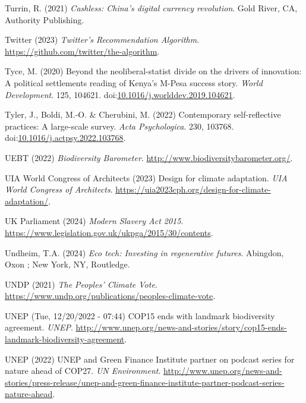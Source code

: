 \documentclass[
  letterpaper,
  DIV=11,
  numbers=noendperiod]{scrartcl}
\newlength{\cslhangindent}
\newenvironment{CSLReferences}[2] %
 {\begin{list}{}{%
  \setlength{\itemindent}{0pt}
  \setlength{\leftmargin}{0pt}
  \setlength{\parsep}{0pt}
  \ifodd #1
   \setlength{\leftmargin}{\cslhangindent}
   \setlength{\itemindent}{-1\cslhangindent}
  \fi
  \setlength{\itemsep}{#2\baselineskip}}}
 {\end{list}}
\begin{document}
\begin{CSLReferences}{0}{1}
Turrin, R. (2021) \emph{Cashless: {China}'s digital currency
revolution}. Gold River, CA, Authority Publishing.

Twitter (2023) \emph{Twitter's {Recommendation Algorithm}}.
\url{https://github.com/twitter/the-algorithm}.

Tyce, M. (2020) Beyond the neoliberal-statist divide on the drivers of
innovation: {A} political settlements reading of {Kenya}'s {M-Pesa}
success story. \emph{World Development}. 125, 104621.
doi:\href{https://doi.org/10.1016/j.worlddev.2019.104621}{10.1016/j.worlddev.2019.104621}.

Tyler, J., Boldi, M.-O. \& Cherubini, M. (2022) Contemporary
self-reflective practices: {A} large-scale survey. \emph{Acta
Psychologica}. 230, 103768.
doi:\href{https://doi.org/10.1016/j.actpsy.2022.103768}{10.1016/j.actpsy.2022.103768}.

UEBT (2022) \emph{Biodiversity {Barometer}}.
\url{http://www.biodiversitybarometer.org/}.

UIA World Congress of Architects (2023) Design for climate adaptation.
\emph{UIA World Congress of Architects}.
\url{https://uia2023cph.org/design-for-climate-adaptation/}.

UK Parliament (2024) \emph{Modern {Slavery Act} 2015}.
\url{https://www.legislation.gov.uk/ukpga/2015/30/contents}.

Undheim, T.A. (2024) \emph{Eco tech: Investing in regenerative futures}.
Abingdon, Oxon ; New York, NY, Routledge.

UNDP (2021) \emph{The {Peoples}' {Climate Vote}}.
\url{https://www.undp.org/publications/peoples-climate-vote}.

UNEP (Tue, 12/20/2022 - 07:44) {COP15} ends with landmark biodiversity
agreement. \emph{UNEP}.
\url{http://www.unep.org/news-and-stories/story/cop15-ends-landmark-biodiversity-agreement}.

UNEP (2022) {UNEP} and {Green Finance Institute} partner on podcast
series for nature ahead of {COP27}. \emph{UN Environment}.
\url{http://www.unep.org/news-and-stories/press-release/unep-and-green-finance-institute-partner-podcast-series-nature-ahead}.


\end{CSLReferences}
\end{document}
